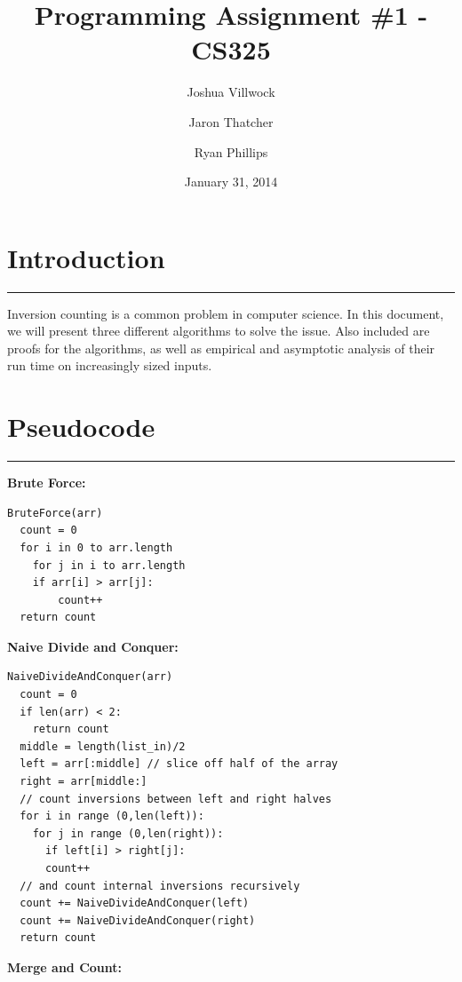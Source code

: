 \documentclass[letterpaper,10pt,titlepage,fleqn]{article}
\begin{document}
\lstset{language=Python} 

\title{Programming Assignment \#1 - CS325}

\author{
	Joshua Villwock \and
	Jaron Thatcher \and
	Ryan Phillips
}

\date{January 31, 2014}
\maketitle
\section*{Introduction}
\hrule

Inversion counting is a common problem in computer science. In this document, we will present three different algorithms to solve the issue. Also included are proofs for the algorithms, as well as empirical and asymptotic analysis of their run time on increasingly sized inputs.


\section*{Pseudocode}
\hrule
\begin{centering}

\textbf{Brute Force:}
\end{centering}
\begin{lstlisting}
BruteForce(arr)
  count = 0
  for i in 0 to arr.length
    for j in i to arr.length
	if arr[i] > arr[j]:
        count++ 
  return count
\end{lstlisting}

\begin{centering}
\textbf{Naive Divide and Conquer:}
\end{centering}
\begin{lstlisting}
NaiveDivideAndConquer(arr)
  count = 0
  if len(arr) < 2:
    return count
  middle = length(list_in)/2
  left = arr[:middle] // slice off half of the array
  right = arr[middle:]
  // count inversions between left and right halves
  for i in range (0,len(left)):
    for j in range (0,len(right)):
      if left[i] > right[j]:
	  count++
  // and count internal inversions recursively
  count += NaiveDivideAndConquer(left)
  count += NaiveDivideAndConquer(right)
  return count
\end{lstlisting}

\begin{centering}
\textbf{Merge and Count:}
\end{centering}
\end{document}
